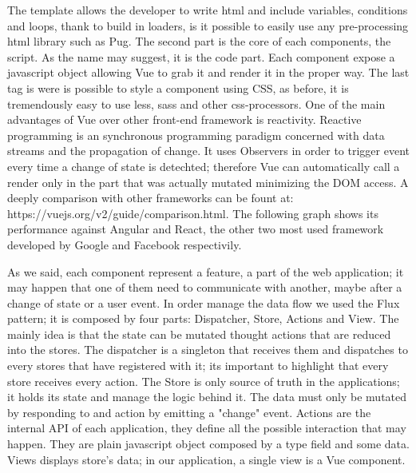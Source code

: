 \documentclass[]{usiinfbachelorproject}
\begin{document}
The template allows the developer to write html and include variables, conditions and loops, thank to build in loaders, is it possible to easily use any pre-processing html library such as Pug.
The second part is the core of each components, the script. As the name may suggest, it is the code part. Each component expose a javascript object allowing Vue to grab it and render it in the proper way.
The last tag is were is possible to style a component using CSS, as before, it is tremendously easy to use less, sass and other css-processors.
One of the main advantages of Vue over other front-end framework is reactivity. Reactive programming is an synchronous programming paradigm concerned with data streams and the propagation of change. It uses Observers in order to trigger event every time a change of state is detechted; therefore Vue can automatically call a render only in the part that was actually mutated minimizing the DOM access.
A deeply comparison with other frameworks can be fount at: https://vuejs.org/v2/guide/comparison.html. The following graph shows its performance against Angular and React, the other two most used framework developed by Google and Facebook respectivily.
\begin{figure}[H]
  \centering
\end{figure} 
As we said, each component represent a feature, a part of the web application; it may happen that one of them need to communicate with another, maybe after a change of state or a user event. In order manage the data flow we used the Flux pattern; it is composed by four parts: Dispatcher, Store, Actions and View.
The mainly idea is that the state can be mutated thought actions that are reduced into the stores. The dispatcher is a singleton that receives them and dispatches to every stores that have registered with it; its important to highlight that every store receives every action.
The Store is only source of truth in the applications; it holds its state and manage the logic behind it. The data must only be mutated by responding to and action by emitting a "change" event.
Actions are the internal API of each application, they define all the possible interaction that may happen. They are plain javascript object composed by a type field and some data.
Views displays store's data; in our application, a single view is a Vue component.
\end{document}
